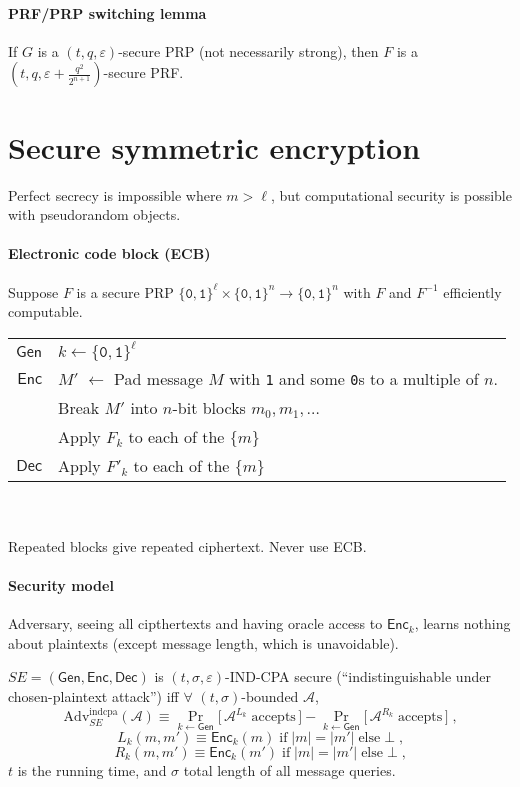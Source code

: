 \documentclass[11pt]{article}
\newcommand{\eqdef}{\ensuremath{\equiv}}
\newcommand{\Gen}{\ensuremath{\mathsf{Gen}}}
\newcommand{\Enc}{\ensuremath{\mathsf{Enc}}}
\newcommand{\Dec}{\ensuremath{\mathsf{Dec}}}
\newcommand{\eps}{\ensuremath{\varepsilon}}
\newcommand{\bit}{\ensuremath{\{\texttt{0},\texttt{1}\}}}
\theoremstyle{remark}
\begin{document}
\paragraph{PRF/PRP switching lemma}
If $G$ is a $(t, q, \eps)$-secure PRP (not necessarily strong),
then $F$ is a $(t, q, \eps + \frac{q^2}{2^{n+1}})$-secure PRF.

\section{Secure symmetric encryption}

Perfect secrecy is impossible where $m > \ell$, but
computational security is possible with pseudorandom objects.

\paragraph{Electronic code block (ECB)}
Suppose $F$ is a secure PRP
$\bit^\ell\times\bit^n\rightarrow\bit^n$
with $F$ and $F^{-1}$ efficiently computable.
~\\[5pt]
\begin{tabular}{r|l}
\Gen & $k \leftarrow \bit^\ell$ \\[5pt]
\Enc & $M'$ $\leftarrow$ Pad message $M$
       with \texttt{1} and some \texttt{0}s
       to a multiple of $n$. \\
     & Break $M'$ into $n$-bit blocks $m_0, m_1, \ldots$ \\
     & Apply $F_k$ to each of the $\{m\}$ \\[5pt]
\Dec & Apply $F'_k$ to each of the $\{m\}$
\end{tabular}\\\\
Repeated blocks give repeated ciphertext.
Never use ECB.

\paragraph{Security model}
Adversary, seeing all cipthertexts and
having oracle access to $\Enc_k$,
learns nothing about plaintexts
(except message length, which is unavoidable).

$SE = (\Gen, \Enc, \Dec)$ is
$(t, \sigma, \eps)$-IND-CPA secure
(``indistinguishable under chosen-plaintext attack'')
iff $\forall$ $(t, \sigma)$-bounded $\mathcal{A}$, \[
\text{Adv}_{SE}^\text{indcpa}(\mathcal{A}) \eqdef
\Pr_{k \leftarrow \Gen} \big[\, \mathcal{A}^{L_k} \; \text{accepts} \,\big]
- \Pr_{k \leftarrow \Gen} \big[\, \mathcal{A}^{R_k} \; \text{accepts} \,\big]
\;\text{,}
\]
\[ L_k(m, m') \eqdef \Enc_k(m)
\;\text{if}\; |m| = |m'|\;\text{else}\; \bot \;\text{,} \]
\[ R_k(m, m') \eqdef \Enc_k(m')
\;\text{if}\; |m| = |m'|\;\text{else}\; \bot \;\text{,} \]
$t$ is the running time, and
$\sigma$ total length of all message queries.
\end{document}
